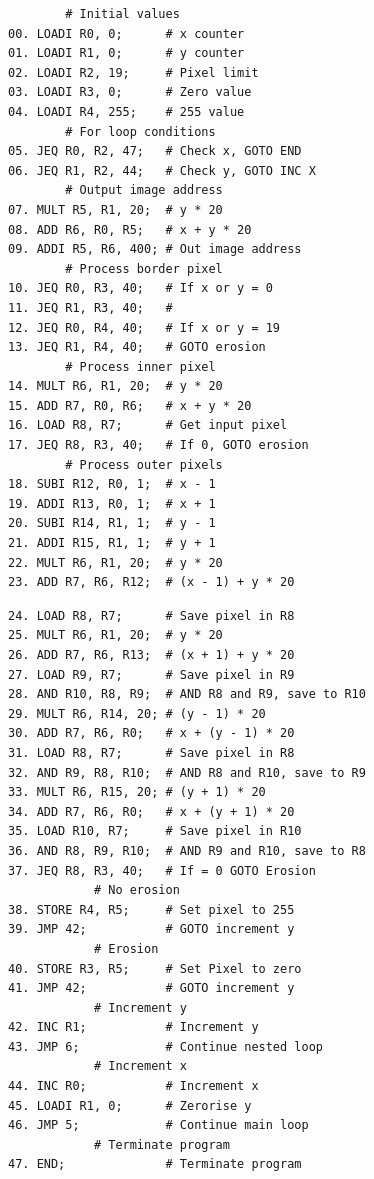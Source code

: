 \documentclass[a4paper, english]{article}
\numberwithin{equation}{section}
\begin{document}
\begin{figure}
    \label{lst:ass}
    \begin{minipage}{0.49\textwidth}
        \vspace{1.5em}
        \centering
        \begin{verbatim}
        # Initial values
00. LOADI R0, 0;      # x counter
01. LOADI R1, 0;      # y counter
02. LOADI R2, 19;     # Pixel limit
03. LOADI R3, 0;      # Zero value
04. LOADI R4, 255;    # 255 value
        # For loop conditions
05. JEQ R0, R2, 47;   # Check x, GOTO END
06. JEQ R1, R2, 44;   # Check y, GOTO INC X
        # Output image address
07. MULT R5, R1, 20;  # y * 20
08. ADD R6, R0, R5;   # x + y * 20
09. ADDI R5, R6, 400; # Out image address
        # Process border pixel
10. JEQ R0, R3, 40;   # If x or y = 0
11. JEQ R1, R3, 40;   #
12. JEQ R0, R4, 40;   # If x or y = 19
13. JEQ R1, R4, 40;   # GOTO erosion
        # Process inner pixel
14. MULT R6, R1, 20;  # y * 20
15. ADD R7, R0, R6;   # x + y * 20
16. LOAD R8, R7;      # Get input pixel
17. JEQ R8, R3, 40;   # If 0, GOTO erosion
        # Process outer pixels
18. SUBI R12, R0, 1;  # x - 1
19. ADDI R13, R0, 1;  # x + 1
20. SUBI R14, R1, 1;  # y - 1
21. ADDI R15, R1, 1;  # y + 1
22. MULT R6, R1, 20;  # y * 20
23. ADD R7, R6, R12;  # (x - 1) + y * 20
    \end{verbatim}
    \end{minipage}
    \begin{minipage}{0.49\textwidth}
        \vspace{.5em}
        \centering
        \begin{verbatim}
24. LOAD R8, R7;      # Save pixel in R8
25. MULT R6, R1, 20;  # y * 20
26. ADD R7, R6, R13;  # (x + 1) + y * 20
27. LOAD R9, R7;      # Save pixel in R9
28. AND R10, R8, R9;  # AND R8 and R9, save to R10
29. MULT R6, R14, 20; # (y - 1) * 20
30. ADD R7, R6, R0;   # x + (y - 1) * 20
31. LOAD R8, R7;      # Save pixel in R8
32. AND R9, R8, R10;  # AND R8 and R10, save to R9
33. MULT R6, R15, 20; # (y + 1) * 20
34. ADD R7, R6, R0;   # x + (y + 1) * 20
35. LOAD R10, R7;     # Save pixel in R10
36. AND R8, R9, R10;  # AND R9 and R10, save to R8
37. JEQ R8, R3, 40;   # If = 0 GOTO Erosion
            # No erosion
38. STORE R4, R5;     # Set pixel to 255
39. JMP 42;           # GOTO increment y
            # Erosion
40. STORE R3, R5;     # Set Pixel to zero
41. JMP 42;           # GOTO increment y
            # Increment y
42. INC R1;           # Increment y
43. JMP 6;            # Continue nested loop
            # Increment x
44. INC R0;           # Increment x
45. LOADI R1, 0;      # Zerorise y
46. JMP 5;            # Continue main loop
            # Terminate program
47. END;              # Terminate program
     \end{verbatim}
    \end{minipage}
\end{figure}
\end{document}
